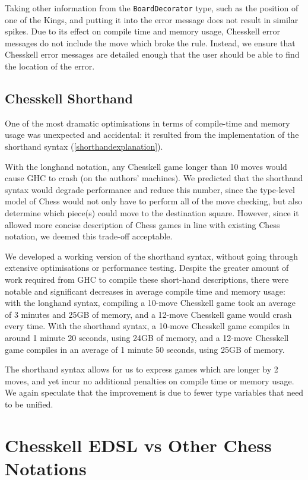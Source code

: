 \documentclass[12pt, a4paper, bibliography=totocnumbered]{scrreprt}
\newcommand{\inline}[1]{\lstinline[basicstyle=\ttfamily\footnotesize]{#1}}
\begin{document}
Taking other information from the \inline{BoardDecorator} type, such as the position of one of the Kings, and putting it into the error message does not result in similar spikes. Due to its effect on compile time and memory usage, Chesskell error messages do not include the move which broke the rule. Instead, we ensure that Chesskell error messages are detailed enough that the user should be able to find the location of the error.

\subsection{Chesskell Shorthand} \label{shorthand}

One of the most dramatic optimisations in terms of compile-time and memory usage was unexpected and accidental: it resulted from the implementation of the shorthand syntax (\cref{shorthandexplanation}).

With the longhand notation, any Chesskell game longer than 10 moves would cause GHC to crash (on the authors' machines). We predicted that the shorthand syntax would degrade performance and reduce this number, since the type-level model of Chess would not only have to perform all of the move checking, but also determine which piece(s) could move to the destination square. However, since it allowed more concise description of Chess games in line with existing Chess notation, we deemed this trade-off acceptable.

We developed a working version of the shorthand syntax, without going through extensive optimisations or performance testing. Despite the greater amount of work required from GHC to compile these short-hand descriptions, there were notable and significant decreases in average compile time and memory usage: with the longhand syntax, compiling a 10-move Chesskell game took an average of 3 minutes and 25GB of memory, and a 12-move Chesskell game would crash every time. With the shorthand syntax, a 10-move Chesskell game compiles in around 1 minute 20 seconds, using 24GB of memory, and a 12-move Chesskell game compiles in an average of 1 minute 50 seconds, using 25GB of memory.

The shorthand syntax allows for us to express games which are longer by 2 moves, and yet incur no additional penalties on compile time or memory usage. We again speculate that the improvement is due to fewer type variables that need to be unified.

\section{Chesskell EDSL vs Other Chess Notations}
\end{document}
